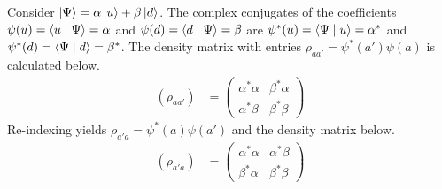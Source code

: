 \begin{answer}
	Consider $\ket{\Psi} = \alpha \ket{u} + \beta \ket{d}$.
	The complex conjugates of the coefficients $\psi(u) = \braket{u \mid \Psi} = \alpha$ and $\psi(d) = \braket{d \mid \Psi} = \beta$ are $\psi^*(u) = \braket{\Psi \mid u} = \alpha^*$ and $\psi^*(d) = \braket{\Psi \mid d} = \beta^*$.
	The density matrix with entries $\rho_{a a'} = \psi^*(a') \psi(a)$ is calculated below.
	\begin{align}
		\left( \rho_{a a'} \right) & =
		\begin{pmatrix}
			\alpha^* \alpha & \beta^* \alpha \\
			\alpha^* \beta  & \beta^* \beta
		\end{pmatrix}
	\end{align}
	Re-indexing yields $\rho_{a' a} = \psi^*(a) \psi(a')$ and the density matrix below.
	\begin{align*}
		\left( \rho_{a' a} \right) & =
		\begin{pmatrix}
			\alpha^* \alpha & \alpha^* \beta \\
			\beta^* \alpha  & \beta^* \beta
		\end{pmatrix}
	\end{align*}
\end{answer}

